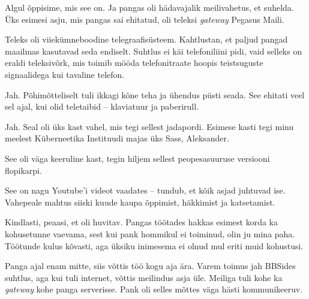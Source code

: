 
Algul õppisime, mis see on. Ja pangas oli hädavajalik meilivahetus, et suhelda. Üks esimesi asju, mis pangas sai 
ehitatud, oli teleksi \emph{gateway} Pegasus Maili. 


Teleks oli viiekümneboodine  telegraafisüsteem. Kahtlustan, et paljud pangad maailmas kasutavad seda endiselt. Suhtlus ei käi telefoniliini 
pidi, vaid selleks on eraldi teleksivõrk, mis toimib mööda telefonitraate 
hoopis teistsuguste signaalidega kui tavaline telefon.


Jah. Põhimõtteliselt tuli ikkagi kõne teha ja ühendus püsti seada. 
See ehitati veel sel ajal, kui olid teletaibid -- klaviatuur ja 
paberirull.


Jah. Seal oli üks kast vahel, mis tegi sellest jadapordi. Esimese kasti tegi minu meelest
Küberneetika Instituudi majas üks Sass, Aleksander.

See oli väga keeruline kast, tegin hiljem sellest peopesasuuruse 
versiooni flopikarpi.


See on nagu Youtube'i videot vaadates -- tundub, et kõik asjad juhtuvad ise. 
Vahepeale mahtus siiski kuude kaupa õppimist, häkkimist ja katsetamist.


Kindlasti, peaasi, et oli huvitav. 
Pangas töötades hakkas esimest korda ka kohusetunne vaevama, sest kui pank hommikul ei toiminud, olin ju mina paha.
Töötunde kulus kõvasti, aga üksiku inimesema ei olnud mul eriti muid kohustusi.


Panga ajal enam mitte, siis võttis töö kogu aja ära. Varem toimus jah BBSides suhtlus, aga kui tuli internet, võttis meilindus asja üle. Meiliga tuli kohe ka  \emph{gateway} 
kohe panga serverisse. Pank oli selles mõttes väga hästi kommunikeeruv.

